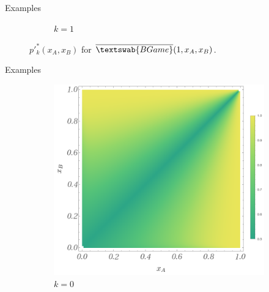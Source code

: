 \documentclass{beamer}
\theoremstyle{definition}
\newcommand{\InfBG}[1]{$\overline{\textswab{BGame}}(#1)$}
\begin{document}
\begin{frame}{Examples}
\begin{figure}[H]
\begin{subfigure}[b]{0.4\textwidth}
        \caption{\small \centering $k=1$}
        \label{fig:ppkBG_1_1}
    \end{subfigure}
    
    \caption{\small \centering $p'^*_k(x_A,x_B)$ for \InfBG{1,x_A,x_B}.}
    \label{fig:ppk_InfBG_1_01}
\end{figure}

\end{frame}

\begin{frame}{Examples}

    
\begin{figure}[H]
    \centering
    \begin{subfigure}[b]{0.3\textwidth}
        \includegraphics[width=\textwidth]{img/BinomialBayesian_ppk_2_0.png}
        \caption{\small \centering $k=0$}
        \label{fig:ppkBG_2_0}
    \end{subfigure}
    \hspace{0.01\textwidth} %
    \begin{subfigure}[b]{0.3\textwidth}

\end{subfigure}
\end{figure}
\end{frame}
\end{document}
